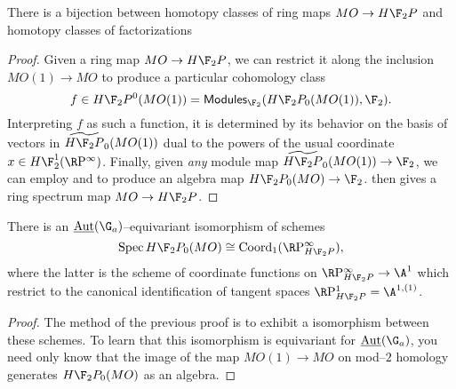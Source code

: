 \begin{corollary}
There is a bijection between homotopy classes of ring maps $MO \to H\F_2P$ and homotopy classes of factorizations
\begin{center}
\end{center}
\end{corollary}
\begin{proof}
Given a ring map $MO \to H\F_2P$, we can restrict it along the inclusion $MO(1) \to MO$ to produce a particular cohomology class \[f \in H\F_2P^0(MO(1)) = \CatOf{Modules}_{\F_2}(H\F_2P_0(MO(1)), \F_2).\]  Interpreting $f$ as such a function, it is determined by its behavior on the basis of vectors in $\widetilde{H\F_2P}_0(MO(1))$ dual to the powers of the usual coordinate $x \in H\F_2^1(\RP^\infty)$.   Finally, given \emph{any} module map $\widetilde{H\F_2P}_0(MO(1)) \to \F_2$, we can employ  and to produce an algebra map $H\F_2P_0(MO) \to \F_2$.  then gives a ring spectrum map $MO \to H\F_2P$.
\end{proof}

\begin{corollary}
There is an $\InternalAut(\G_a)$--equivariant isomorphism of schemes \[\Spec H\F_2P_0(MO) \cong \Coord_1(\RP^\infty_{H\F_2P}),\] where the latter is the scheme of coordinate functions on $\RP^\infty_{H\F_2P} \to \A^1$ which restrict to the canonical identification of tangent spaces $\RP^1_{H\F_2P} = \A^{1,(1)}$.
\end{corollary}
\begin{proof}
The method of the previous proof is to exhibit a isomorphism between these schemes.  To learn that this isomorphism is equivariant for $\InternalAut(\G_a)$, you need only know that the image of the map $MO(1) \to MO$ on mod--$2$ homology generates $H\F_2P_0(MO)$ as an algebra. 
\end{proof}

